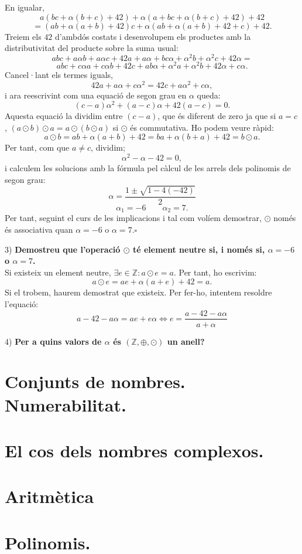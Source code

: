 \documentclass[11pt]{article}
\begin{document}
\begin{legal}
\begin{legal}
\begin{itemize}
		\end{itemize}
		En igualar,
		$$
		a(bc+\alpha(b+c)+42)+\alpha(a+bc+\alpha(b+c)+42)+42
		$$
		$$
		=(ab+\alpha(a+b)+42)c+\alpha(ab+\alpha(a+b)+42+c)+42.
		$$
		Treiem els $42$ d'ambdós costats i desenvolupem els productes amb la distributivitat del producte sobre la suma usual:
		$$
		abc+a\alpha b+a\alpha c+42a+a\alpha+bc\alpha+\alpha^2b+\alpha^2c+42\alpha=
		$$
		$$
		abc+c\alpha a+c\alpha b+42c+ab\alpha+\alpha^2a+\alpha^2b+42\alpha+c\alpha.
		$$
		Cancel·lant els termes iguals,
		$$
		42a+a\alpha +c\alpha^2=42c+a\alpha^2+c\alpha,
		$$
		i ara reescrivint com una equació de segon grau en $\alpha$ queda:
		$$
		(c-a)\alpha^2+(a-c)\alpha+42(a-c)=0.
		$$
		Aquesta equació la dividim entre $(c-a)$, que és diferent de zero ja que si $a=c$, $(a\odot b)\odot a=a\odot(b\odot a)$ si $\odot$ és commutativa. Ho podem veure ràpid:
		$$a\odot b=ab+\alpha(a+b)+42=ba+\alpha(b+a)+42=b\odot a.$$
		Per tant, com que $a\neq c$, dividim;
		$$
		\alpha^2-\alpha-42=0,
		$$
		i calculem les solucions amb la fórmula pel càlcul de les arrels dels polinomis de segon grau:
		$$
		\alpha=\dfrac{1\pm\sqrt{1-4(-42)}}{2}
		$$
		$$
		\alpha_1=-6\qquad\alpha_2=7.
		$$
		Per tant, seguint el curs de les implicacions i tal com volíem demostrar, $\odot$ només és associativa quan $\alpha=-6$ o $\alpha=7$.$\square$
		\item[3)] \textbf{Demostreu que l'operació $\odot$ té element neutre si, i només si, $\alpha=-6$ o $\alpha=7$.}\\
		Si existeix un element neutre, $\exists e\in\mathbb{Z}:a\odot e=a$. Per tant, ho escrivim:
		$$a\odot e=ae+\alpha(a+e)+42=a.$$
		Si el trobem, haurem demostrat que existeix. Per fer-ho, intentem resoldre l'equació:
		$$a-42-a\alpha=ae+e\alpha\iff e=\dfrac{a-42-a\alpha}{a+\alpha}$$
		\item[4)] \textbf{Per a quins valors de $\alpha$ és $(\mathbb{Z},\oplus,\odot)$ un anell?}
	\end{legal}
\end{legal}

\newpage

\section{Conjunts de nombres. Numerabilitat.}

\newpage

\section{El cos dels nombres complexos.}

\newpage

\section{Aritmètica}

\newpage

\section{Polinomis.}
\end{document}
